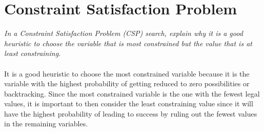 \documentclass{article}
\begin{document}
\section{Constraint Satisfaction Problem}
\textit{In a Constraint Satisfaction Problem (CSP) search, explain why it is a good heuristic to choose the variable that is most constrained but the value that is at least constraining.}
\\\\
It is a good heuristic to choose the most constrained variable because it is the variable with the highest probability of getting reduced to zero possibilities or backtracking. Since the most constrained variable is the one with the fewest legal values, it is important to then consider the least constraining value since it will have the highest probability of leading to success by ruling out the fewest values in the remaining variables.
\end{document}
